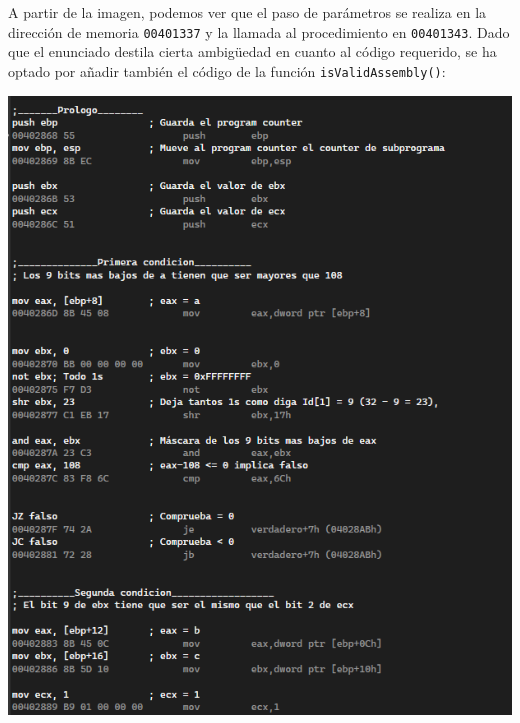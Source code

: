 \documentclass[11pt,a4paper]{article}
\begin{document}
\noindent A partir de la imagen, podemos ver que el paso de parámetros se realiza en la dirección de memoria \texttt{00401337} y la llamada al procedimiento en \texttt{00401343}. Dado que el enunciado destila cierta ambigüedad en cuanto al código requerido, se ha optado por añadir también el código de la función \texttt{isValidAssembly()}: \vspace{2ex}

\begin{center}
  \begin{minipage}{0.49\textwidth}
      \includegraphics[width=1.055\textwidth]{isValidAssembly1.png}
  \end{minipage}
  \begin{minipage}{0.49\textwidth}

\end{minipage}
\end{center}
\end{document}
